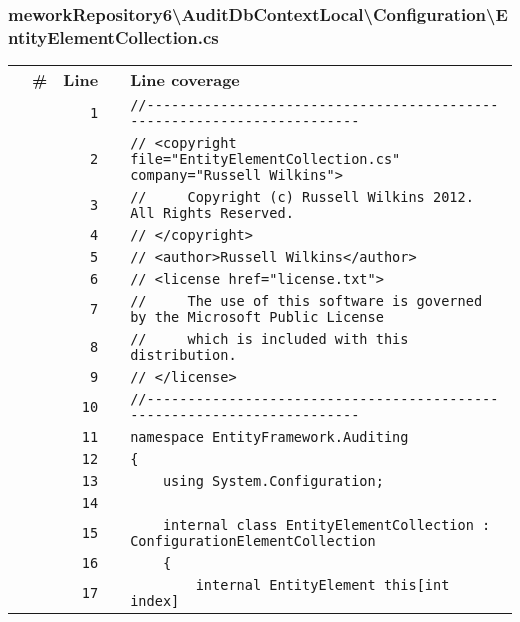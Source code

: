 \documentclass[a4paper,10pt]{article}
\begin{document}
\subsubsection{meworkRepository6\textbackslash AuditDbContextLocal\textbackslash Configuration\textbackslash EntityElementCollection.cs}
\begin{longtable}[l]{lrrll}
\textbf{} & \textbf{\#} & \textbf{Line} & \textbf{} & \textbf{Line coverage}\\
\cellcolor{gray} &  & \verb~1~ & & \verb~//-----------------------------------------------------------------------~\\
\cellcolor{gray} &  & \verb~2~ & & \verb~// <copyright file="EntityElementCollection.cs" company="Russell Wilkins">~\\
\cellcolor{gray} &  & \verb~3~ & & \verb~//     Copyright (c) Russell Wilkins 2012. All Rights Reserved.~\\
\cellcolor{gray} &  & \verb~4~ & & \verb~// </copyright>~\\
\cellcolor{gray} &  & \verb~5~ & & \verb~// <author>Russell Wilkins</author>~\\
\cellcolor{gray} &  & \verb~6~ & & \verb~// <license href="license.txt">~\\
\cellcolor{gray} &  & \verb~7~ & & \verb~//     The use of this software is governed by the Microsoft Public License~\\
\cellcolor{gray} &  & \verb~8~ & & \verb~//     which is included with this distribution.~\\
\cellcolor{gray} &  & \verb~9~ & & \verb~// </license>~\\
\cellcolor{gray} &  & \verb~10~ & & \verb~//-----------------------------------------------------------------------~\\
\cellcolor{gray} &  & \verb~11~ & & \verb~namespace EntityFramework.Auditing~\\
\cellcolor{gray} &  & \verb~12~ & & \verb~{~\\
\cellcolor{gray} &  & \verb~13~ & & \verb~    using System.Configuration;~\\
\cellcolor{gray} &  & \verb~14~ & & \verb~~\\
\cellcolor{gray} &  & \verb~15~ & & \verb~    internal class EntityElementCollection : ConfigurationElementCollection~\\
\cellcolor{gray} &  & \verb~16~ & & \verb~    {~\\
\cellcolor{gray} &  & \verb~17~ & & \verb~        internal EntityElement this[int index]~\\

\end{longtable}
\end{document}
